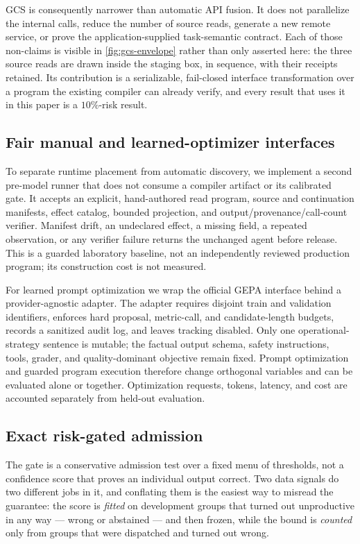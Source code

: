 GCS is consequently narrower than automatic API fusion.  It does not parallelize the
internal calls, reduce the number of source reads, generate a new remote service, or prove
the application-supplied task-semantic contract.  Each of those non-claims is visible in
\cref{fig:gcs-envelope} rather than only asserted here: the three source reads are drawn
inside the staging box, in sequence, with their receipts retained.  Its contribution is a
serializable, fail-closed interface transformation over a program the existing compiler
can already verify, and every result that uses it in this paper is a $10\%$-risk result.

\subsection{Fair manual and learned-optimizer interfaces}
\label{sec:optimizer-method}

To separate runtime placement from automatic discovery, we implement a second pre-model
runner that does not consume a compiler artifact or its calibrated gate.  It accepts an
explicit, hand-authored read program, source and continuation manifests, effect catalog,
bounded projection, and output/provenance/call-count verifier.  Manifest drift, an
undeclared effect, a missing field, a repeated observation, or any verifier failure returns
the unchanged agent before release.  This is a guarded laboratory baseline, not an
independently reviewed production program; its construction cost is not measured.

For learned prompt optimization we wrap the official GEPA 
interface behind a provider-agnostic adapter.  The adapter requires disjoint train and
validation identifiers, enforces hard proposal, metric-call, and candidate-length budgets,
records a sanitized audit log, and leaves tracking disabled.  Only one operational-strategy
sentence is mutable; the factual output schema, safety instructions, tools, grader, and
quality-dominant objective remain fixed.  Prompt optimization and guarded program execution
therefore change orthogonal variables and can be evaluated alone or together.  Optimization
requests, tokens, latency, and cost are accounted separately from held-out evaluation.

\subsection{Exact risk-gated admission}

The gate is a conservative admission test over a fixed menu of thresholds, not a
confidence score that proves an individual output correct.  Two data signals do two
different jobs in it, and conflating them is the easiest way to misread the guarantee:
the score is \emph{fitted} on development groups that turned out unproductive in any way
--- wrong or abstained --- and then frozen, while the bound is \emph{counted} only from
groups that were dispatched and turned out wrong.

